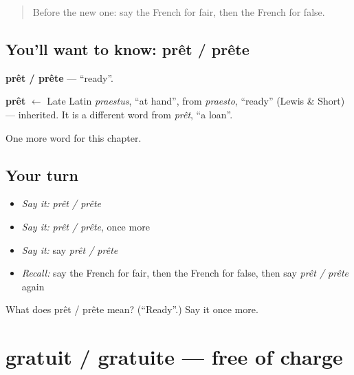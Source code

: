 \label{lesson:FR-C245-pret-prete}



\begin{quote}
Before the new one: say the French for fair, then the French for false.
\end{quote}

\subsection*{You'll want to know: prêt / prête}
\textbf{prêt / prête} — \textquotedblleft{}ready\textquotedblright{}.

\begin{cousinweb}
\textbf{prêt} $\leftarrow$ Late Latin \emph{praestus}, \textquotedblleft{}at hand\textquotedblright{}, from \emph{praesto}, \textquotedblleft{}ready\textquotedblright{} (Lewis \& Short) — inherited. It is a different word from \emph{prêt}, \textquotedblleft{}a loan\textquotedblright{}.
\end{cousinweb}

\begin{grammarlens}[title={What you've built}]
One more word for this chapter.
\end{grammarlens}

\subsection*{Your turn}
\begin{itemize}
\raggedright
  \item \emph{Say it:} \emph{prêt / prête}
  \item \emph{Say it:} \emph{prêt / prête}, once more
  \item \emph{Say it:} say \emph{prêt / prête}
  \item \emph{Recall:} say the French for fair, then the French for false, then say \emph{prêt / prête} again
\end{itemize}

\begin{tcolorbox}[breakable,colback=teal!4,colframe=teal!35!black,title={Before you move on}]
What does prêt / prête mean? (\textquotedblleft{}Ready\textquotedblright{}.) Say it once more.
\end{tcolorbox}
\section[gratuit / gratuite]{gratuit / gratuite — free of charge}

